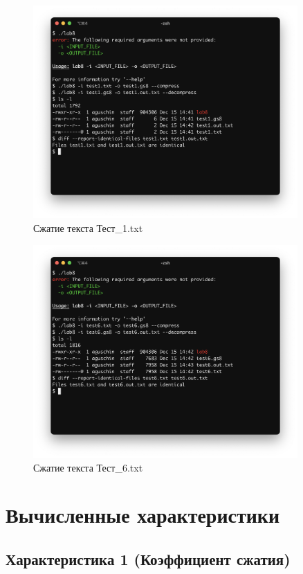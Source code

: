 \documentclass[a4paper,oneside]{article}
\theoremstyle{definition}
\begin{document}
\begin{figure}[H]
  \centering
  \includegraphics[width=0.9\textwidth]{test1.png}
  \caption{Сжатие текста Тест\_1.txt}
  \label{fig:test_1}
\end{figure}

\begin{figure}[H]
  \centering
  \includegraphics[width=0.9\textwidth]{test6.png}
  \caption{Сжатие текста Тест\_6.txt}
  \label{fig:test_6}
\end{figure}


\section{Вычисленные характеристики}

\subsection{Характеристика 1 (Коэффициент сжатия)}
\end{document}
